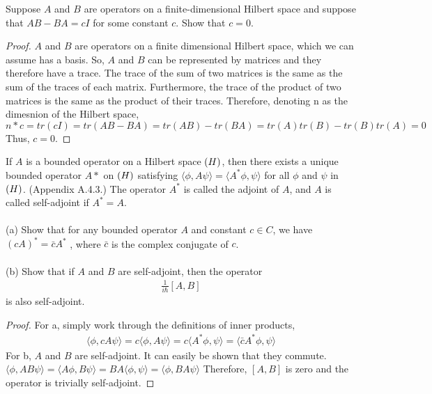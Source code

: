 \documentclass[10pt]{article}
\newenvironment{problem}[2][Problem]{\begin{trivlist}
		\item[\hskip \labelsep {\bfseries #1}\hskip \labelsep {\bfseries #2.}]}{\end{trivlist}}
\begin{document}
    \begin{problem}{3.2} 
    	Suppose $A$ and $B$ are operators on a finite-dimensional Hilbert space
    	and suppose that $AB - BA = cI$ 
    	for some constant $c$. Show that
    	$c = 0$.
	\end{problem}
	\begin{proof}
		$A$ and $B$ are operators on a finite dimensional Hilbert space, which we can assume has a basis. So, $A$ and $B$ can be represented by matrices and they therefore have a trace. The trace of the sum of two matrices is the same as the sum of the traces of each matrix. Furthermore, the trace of the product of two matrices is the same as the product of their traces. Therefore, denoting n as the dimesnion of the Hilbert space, $n*c = tr(cI) = tr(AB - BA) = tr(AB) - tr(BA) = tr(A)tr(B) - tr(B)tr(A) = 0$ Thus, $c=0$. 
	\end{proof}
	\begin{problem}{3.3}
		If $A$ is a bounded operator on a Hilbert space $\bold(H)$, then there exists a
		unique bounded operator $A*$ on $\bold(H)$ satisfying  $\langle \phi, A \psi \rangle = \langle A^{*} \phi, \psi \rangle$ for
		all $\phi$ and $\psi$ in $\bold(H)$. (Appendix A.4.3.) The operator $A^{*}$ is called the
		adjoint of $A$, and $A$ is called self-adjoint if $A^{*} = A$.\\
		\\
		(a) Show that for any bounded operator $A$ and constant $c \in C$, we
		have $(cA)^{*} = \bar{c}A^{*}$ , where $\bar{c}$ is the complex conjugate of $c$.\\
		\\
		(b) Show that if $A$ and $B$ are self-adjoint, then the operator
		\begin{align*}
			\frac{1}{i \hbar}[A, B]
		\end{align*}
		is also self-adjoint.
	\end{problem}
	
	\begin{proof}
		For a, simply work through the definitions of inner products,
		\begin{align*}
			\langle \phi, cA \psi \rangle = c\langle \phi, A \psi \rangle = c\langle A^{*} \phi, \psi \rangle = \langle \bar{c}A^{*} \phi, \psi \rangle
		\end{align*}
		For b, $A$ and $B$ are self-adjoint. It can easily be shown that they commute. $\langle \phi, AB \psi \rangle = \langle  A \phi, B \psi \rangle = BA \langle   \phi,  \psi \rangle = \langle \phi, BA \psi \rangle$ Therefore, $[A,B]$ is zero and the operator is trivially self-adjoint.
	\end{proof}
	
	
\end{document}
